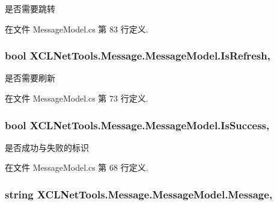 是否需要跳转 



在文件 Message\-Model.\-cs 第 83 行定义.

\hypertarget{class_x_c_l_net_tools_1_1_message_1_1_message_model_a9bdd2a6fd62936962fe1a06233809f02}{
\subsubsection[{Is\-Refresh}]{\setlength{\rightskip}{0pt plus 5cm}bool X\-C\-L\-Net\-Tools.\-Message.\-Message\-Model.\-Is\-Refresh\hspace{0.3cm}{\ttfamily [get]}, {\ttfamily [set]}}}\label{class_x_c_l_net_tools_1_1_message_1_1_message_model_a9bdd2a6fd62936962fe1a06233809f02}


是否需要刷新 



在文件 Message\-Model.\-cs 第 73 行定义.

\hypertarget{class_x_c_l_net_tools_1_1_message_1_1_message_model_a05485b542b8ef7f795ed5618fb80da03}{
\subsubsection[{Is\-Success}]{\setlength{\rightskip}{0pt plus 5cm}bool X\-C\-L\-Net\-Tools.\-Message.\-Message\-Model.\-Is\-Success\hspace{0.3cm}{\ttfamily [get]}, {\ttfamily [set]}}}\label{class_x_c_l_net_tools_1_1_message_1_1_message_model_a05485b542b8ef7f795ed5618fb80da03}


是否成功与失败的标识 



在文件 Message\-Model.\-cs 第 68 行定义.

\hypertarget{class_x_c_l_net_tools_1_1_message_1_1_message_model_a2c6df6335e3adab4b188833ce8fec192}{
\subsubsection[{Message}]{\setlength{\rightskip}{0pt plus 5cm}string X\-C\-L\-Net\-Tools.\-Message.\-Message\-Model.\-Message\hspace{0.3cm}{\ttfamily [get]}, {\ttfamily [set]}}}\label{class_x_c_l_net_tools_1_1_message_1_1_message_model_a2c6df6335e3adab4b188833ce8fec192}


